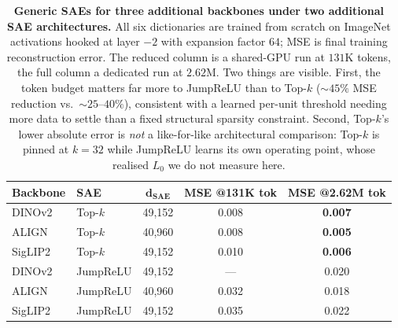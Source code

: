 \begin{table}[htbp]
\centering
\small
\caption{\textbf{Generic SAEs for three additional backbones under two additional SAE
architectures.} All six dictionaries are trained from scratch on ImageNet activations
hooked at layer $-2$ with expansion factor $64$; MSE is final training reconstruction
error. The reduced column is a shared-GPU run at $131$K tokens, the full column a
dedicated run at $2.62$M. Two things are visible. First, the token budget matters far
more to JumpReLU than to Top-$k$ ($\sim\!45\%$ MSE reduction vs.\ $\sim\!25$--$40\%$),
consistent with a learned per-unit threshold needing more data to settle than a fixed
structural sparsity constraint. Second, Top-$k$'s lower absolute error is
\emph{not} a like-for-like architectural comparison: Top-$k$ is pinned at $k=32$ while
JumpReLU learns its own operating point, whose realised $L_0$ we do not measure here.}
\label{tab:expanded_base_sae}
\setlength{\tabcolsep}{7pt}
\begin{tabular}{llccc}
\toprule
\textbf{Backbone} & \textbf{SAE} & $\mathbf{d_{SAE}}$ & \textbf{MSE @131K tok} & \textbf{MSE @2.62M tok} \\
\midrule
DINOv2~\citep{oquab2024dinov2}   & Top-$k$   & 49{,}152 & 0.008 & \bf 0.007 \\
ALIGN~\citep{jia2021scaling}     & Top-$k$   & 40{,}960 & 0.008 & \bf 0.005 \\
SigLIP2~\citep{tschannen2025siglip2} & Top-$k$ & 49{,}152 & 0.010 & \bf 0.006 \\
\midrule
DINOv2   & JumpReLU & 49{,}152 & --- & 0.020 \\
ALIGN    & JumpReLU & 40{,}960 & 0.032 & 0.018 \\
SigLIP2  & JumpReLU & 49{,}152 & 0.035 & 0.022 \\
\bottomrule
\end{tabular}
\end{table}
